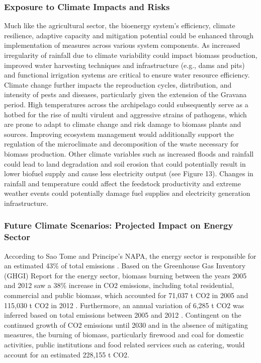 \documentclass[
]{book}
\begin{document}
\hypertarget{exposure-to-climate-impacts-and-risks-4}{%
\subsubsection{Exposure to Climate Impacts and Risks}\label{exposure-to-climate-impacts-and-risks-4}}

Much like the agricultural sector, the bioenergy system's efficiency, climate resilience, adaptive capacity and mitigation potential could be enhanced through implementation of measures across various system components. As increased irregularity of rainfall due to climate variability could impact biomass production, improved water harvesting techniques and infrastructure (e.g., dams and pits) and functional irrigation systems are critical to ensure water resource efficiency. Climate change further impacts the reproduction cycles, distribution, and intensity of pests and diseases, particularly given the extension of the Gravana period. High temperatures across the archipelago could subsequently serve as a hotbed for the rise of multi virulent and aggressive strains of pathogens, which are prone to adapt to climate change and risk damage to biomass plants and sources. Improving ecosystem management would additionally support the regulation of the microclimate and decomposition of the waste necessary for biomass production. Other climate variables such as increased floods and rainfall could lead to land degradation and soil erosion that could potentially result in lower biofuel supply and cause less electricity output (see Figure 13). Changes in rainfall and temperature could affect the feedstock productivity and extreme weather events could potentially damage fuel supplies and electricity generation infrastructure.

\hypertarget{future-climate-scenarios-projected-impact-on-energy-sector}{%
\subsubsection{Future Climate Scenarios: Projected Impact on Energy Sector}\label{future-climate-scenarios-projected-impact-on-energy-sector}}

According to Sao Tome and Principe's NAPA, the energy sector is responsible for an estimated 43\% of total emissions . Based on the Greenhouse Gas Inventory (GHGI) Report for the energy sector, biomass burning between the years 2005 and 2012 saw a 38\% increase in CO2 emissions, including total residential, commercial and public biomass, which accounted for 71,037 t CO2 in 2005 and 115,030 t CO2 in 2012 . Furthermore, an annual variation of 6,285 t CO2 was inferred based on total emissions between 2005 and 2012 . Contingent on the continued growth of CO2 emissions until 2030 and in the absence of mitigating measures, the burning of biomass, particularly firewood and coal for domestic activities, public institutions and food related services such as catering, would account for an estimated 228,155 t CO2.
\end{document}
